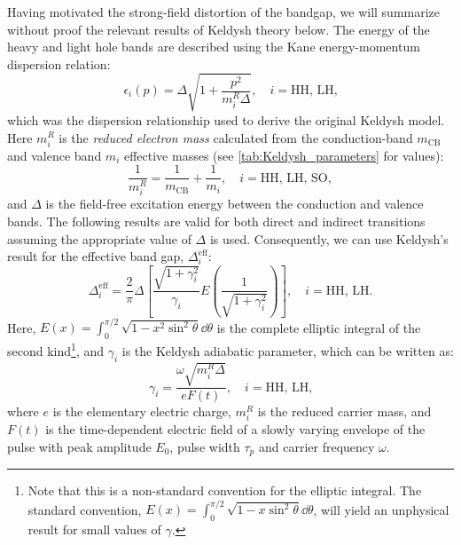 Having motivated the strong-field distortion of the bandgap, we will summarize without proof the relevant results of Keldysh theory below. The energy of the heavy and light hole bands are described using the Kane energy-momentum dispersion relation:
\begin{equation}
	\epsilon_i(p) = \Delta \sqrt{1+\frac{p^2}{m_i^R \Delta}}, \quad i = \textrm{HH, LH,}
\end{equation}
which was the dispersion relationship used to derive the original Keldysh model. Here $m_i^R$ is the \textit{reduced electron mass} calculated from the conduction-band $m_{\textrm{CB}}$ and valence band $m_i$ effective masses (see \cref{tab:Keldysh_parameters} for values):
\begin{equation}
	\frac{1}{m_i^R} = \frac{1}{m_{\textrm{CB}}} + \frac{1}{m_i}, \quad i = \textrm{HH, LH, SO},
	\label{eqn:reduced_electron_mass}
\end{equation}
and $\Delta$ is the field-free excitation energy between the conduction and valence bands. The following results are valid for both direct and indirect transitions assuming the appropriate value of $\Delta$ is used. Consequently, we can use Keldysh's result for the effective band gap, $\Delta_i^{\textrm{eff}}$:
\begin{equation}
	\Delta_i^{\textrm{eff}} = \frac{2}{\pi} \Delta \left[ \frac{\sqrt{1+\gamma_i^2}}{\gamma_i} E\left(\frac{1}{\sqrt{1+\gamma_i^2}}\right) \right], \quad i = \textrm{HH, LH.}
	\label{eqn:eff_bandgap_HHLL}
\end{equation}
Here, $E(x) = \int_{0}^{\pi/2} \sqrt{1 - x^2 \sin^2 \theta} \dd{\theta}$ is the complete elliptic integral of the second kind\footnote{Note that this is a non-standard convention for the elliptic integral. The standard convention, ${E(x) = \int_{0}^{\pi/2} \sqrt{1 - x \sin^2 \theta} \dd{\theta}}$, will yield an unphysical result for small values of $\gamma$.}, and $\gamma_i$ is the Keldysh adiabatic parameter, which can be written as:
\begin{equation}
	\label{eqn:gamma_HH_LH}
	\gamma_i = \frac{\omega \sqrt{m_i^R \Delta}}{e F(t)}, \quad i = \textrm{HH, LH,}
\end{equation}
where $e$ is the elementary electric charge, $m_i^R$ is the reduced carrier mass, and $F(t)$ is the time-dependent electric field of a slowly varying envelope of the pulse with peak amplitude $E_0$, pulse width $\tau_p$ and carrier frequency $\omega$.

